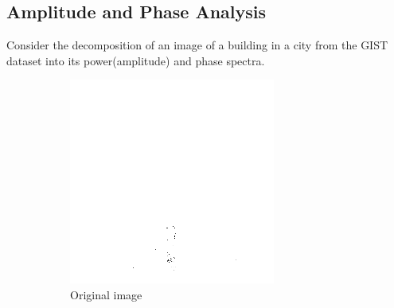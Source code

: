 \documentclass{report}
\begin{document}
\subsection{Amplitude and Phase Analysis}
Consider the decomposition of an image of a building in a city from the GIST dataset into its power(amplitude) and phase spectra.
\begin{figure}[H]
        \centering
        \begin{subfigure}[b]{0.2\textwidth}
                \includegraphics[width=\textwidth]{graphics/original.png}
                \caption{Original image}
                \label{fig:gull}
        \end{subfigure}%
        ~
        \begin{subfigure}[b]{0.2\textwidth}

\end{subfigure}
\end{figure}
\end{document}

